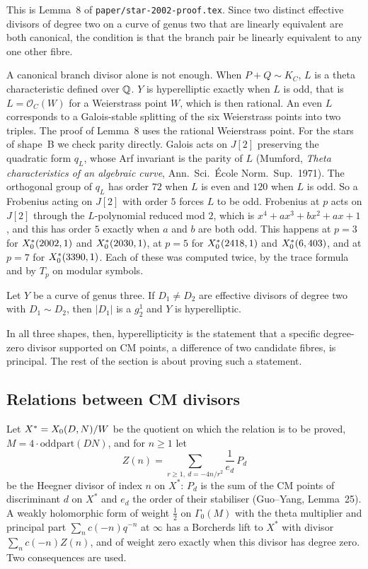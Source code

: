 This is Lemma~8 of \texttt{paper/star-2002-proof.tex}. Since two distinct effective divisors of degree two on a
curve of genus two that are linearly equivalent are both canonical, the condition is that the branch pair be
linearly equivalent to any one other fibre.

A canonical branch divisor alone is not enough. When $P+Q\sim K_C$, $L$ is a theta characteristic defined over
$\mathbb{Q}$. $Y$ is hyperelliptic exactly when $L$ is odd, that is $L=\mathcal O_C(W)$ for a Weierstrass point $W$,
which is then rational. An even $L$ corresponds to a Galois-stable splitting of the six Weierstrass points into two triples.
The proof of Lemma~8 uses the rational Weierstrass point. For the stars of shape~B we check parity directly.
Galois acts on $J[2]$ preserving the quadratic form $q_L$, whose Arf invariant is the parity of $L$
(Mumford, \emph{Theta characteristics of an algebraic curve}, Ann.\ Sci.\ \'Ecole Norm.\ Sup.\ 1971). The orthogonal group of $q_L$ has order $72$ when $L$ is even and $120$ when $L$ is odd. So a
Frobenius acting on $J[2]$ with order $5$ forces $L$ to be odd. Frobenius at $p$ acts on $J[2]$ through the
$L$-polynomial reduced mod $2$, which is $x^4+ax^3+bx^2+ax+1$, and this has order $5$ exactly when $a$ and $b$
are both odd. This happens at $p=3$ for $X_0^*({2002},{1})$ and $X_0^*({2030},{1})$, at $p=5$ for
$X_0^*({2418},{1})$ and $X_0^*({6},{403})$, and at $p=7$ for $X_0^*({3390},{1})$. Each of these was computed
twice, by the trace formula and by $T_p$ on modular symbols.

\begin{proposition}\label{prop:g12}
Let $Y$ be a curve of genus three. If $D_1\neq D_2$ are effective divisors of degree two with $D_1\sim D_2$, then
$|D_1|$ is a $g^1_2$ and $Y$ is hyperelliptic.
\end{proposition}

In all three shapes, then, hyperellipticity is the statement that a specific degree-zero divisor supported on CM
points, a difference of two candidate fibres, is principal. The rest of the section is about proving such a
statement.

\subsection{Relations between CM divisors}\label{sec:candidates-relations}

Let $X^*=X_0({D},{N})/W$ be the quotient on which the relation is to be proved, $M=4\cdot\mathrm{oddpart}(DN)$,
and for $n\ge1$ let
\[
Z(n)=\sum_{r\ge1,\ d=-4n/r^2}\frac1{e_d}\,P_d
\]
be the Heegner divisor of index $n$ on $X^*$: $P_d$ is the sum of the CM points of discriminant $d$ on $X^*$ and
$e_d$ the order of their stabiliser (Guo--Yang, Lemma~25). A weakly holomorphic form of weight $\tfrac12$ on
$\Gamma_0(M)$ with the theta multiplier and principal part $\sum_n c(-n)q^{-n}$ at $\infty$ has a Borcherds lift
to $X^*$ with divisor $\sum_n c(-n)Z(n)$, and of weight zero exactly when this divisor has degree zero. Two
consequences are used.

